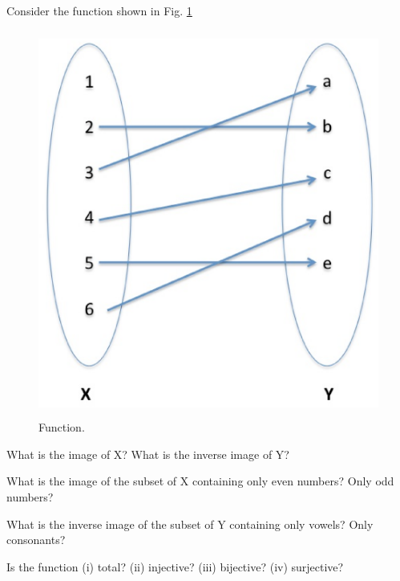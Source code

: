 \documentclass[handout]{mcs}
\begin{document}

\begin{problem}
Consider the function shown in Fig. \ref{fig:img} 

\begin{figure}[h]

\includegraphics[height = 5in ]{image-inverseimage2}

\caption{Function.}
\label{fig:img}
\end{figure}
\bparts
\ppart What is the image of X? What is the inverse image of Y?

\ppart What is the image of the subset of X containing only even numbers? Only odd numbers?

\ppart What is the inverse image of the subset of Y containing only vowels? Only consonants?

\ppart Is the function (i) total? (ii) injective? (iii) bijective? (iv) surjective?

\end{problem}

\end{document}
